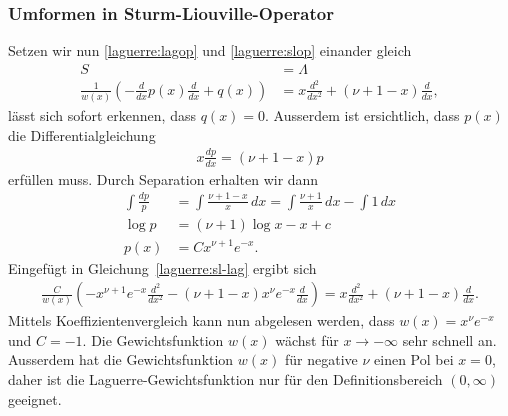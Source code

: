 
\subsubsection{Umformen in Sturm-Liouville-Operator}
Setzen wir nun 
\eqref{laguerre:lagop} und \eqref{laguerre:slop}
einander gleich
\begin{align}
S
 & =
\Lambda
\nonumber
\\
\frac{1}{w(x)} \left(-\frac{d}{dx}p(x) \frac{d}{dx} + q(x) \right)
 & =
x \frac{d^2}{dx^2} + (\nu + 1 - x) \frac{d}{dx}
\label{laguerre:sl-lag}
,
\end{align}
lässt sich sofort erkennen, dass $q(x) = 0$.
Ausserdem ist ersichtlich, dass $p(x)$ die Differentialgleichung
\begin{align*}
x \frac{dp}{dx}
=
(\nu + 1 - x) p
\end{align*}
erfüllen muss.
Durch Separation erhalten wir dann
\begin{align*}
\int \frac{dp}{p}
 & =
\int \frac{\nu + 1 - x}{x} \, dx
=
\int \frac{\nu + 1}{x} \, dx - \int 1\, dx
\\
\log p
 & =
(\nu + 1)\log x - x + c
\\
p(x)
 & =
C x^{\nu + 1} e^{-x}
.
\end{align*}
Eingefügt in Gleichung~\eqref{laguerre:sl-lag} ergibt sich
\begin{align*}
\frac{C}{w(x)}
\left(
-x^{\nu+1} e^{-x} \frac{d^2}{dx^2} -
(\nu + 1 - x) x^{\nu} e^{-x} \frac{d}{dx}
\right)
=
x \frac{d^2}{dx^2} + (\nu + 1 - x) \frac{d}{dx}.
\end{align*}
Mittels Koeffizientenvergleich kann nun abgelesen werden,
dass $w(x) = x^\nu e^{-x}$ und $C=-1$. %
Die Gewichtsfunktion $w(x)$ wächst für $x\rightarrow-\infty$ sehr schnell an.
Ausserdem hat die Gewichtsfunktion $w(x)$ für negative $\nu$ einen Pol bei $x=0$,
daher ist die Laguerre-Gewichtsfunktion nur für den
Definitionsbereich $(0, \infty)$ geeignet.

